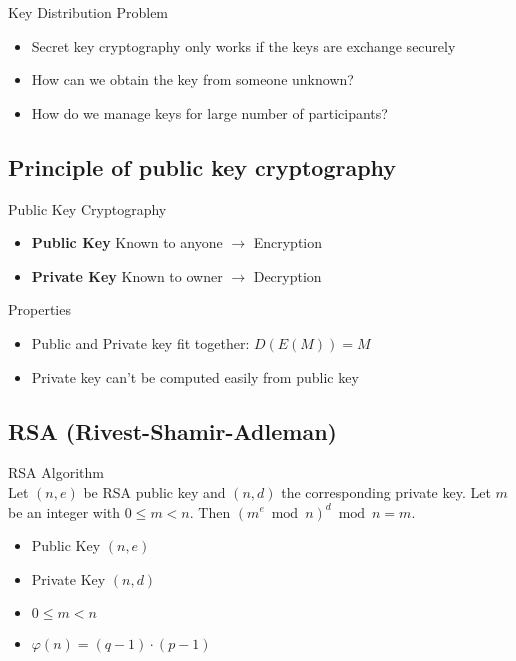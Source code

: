 \begin{concept}{Key Distribution Problem}\\
    \begin{itemize}
        \item Secret key cryptography only works if the keys are exchange securely
        \item How can we obtain the key from someone unknown?
        \item How do we manage keys for large number of participants?
    \end{itemize}
\end{concept}

\subsection{Principle of public key cryptography}

\begin{definition}{Public Key Cryptography}\\
    \begin{itemize}
        \item \textbf{Public Key} Known to anyone $\rightarrow$ Encryption
        \item \textbf{Private Key} Known to owner $\rightarrow$ Decryption
    \end{itemize}
\end{definition}

\begin{concept}{Properties}\\
    \begin{itemize}
        \item Public and Private key fit together: $D(E(M)) = M$
        \item Private key can't be computed easily from public key
    \end{itemize}
\end{concept}


\subsection{RSA (Rivest-Shamir-Adleman)}

\begin{definition}{RSA Algorithm}\\
    Let $(n, e)$ be RSA public key and $(n, d)$ the corresponding private key. Let $m$ be an integer with $0 \leq m < n$. Then $(m^e \bmod n)^d \bmod n = m$.
    \begin{itemize}
        \item Public Key $(n, e)$
        \item Private Key $(n, d)$
        \item $0 \leq m < n$
        \item $\varphi(n) = (q - 1) \cdot (p - 1)$
    \end{itemize}
\end{definition}

